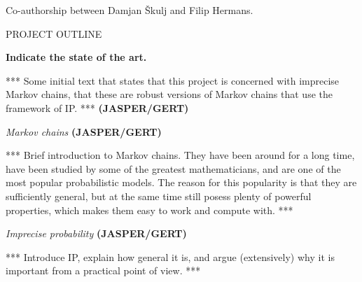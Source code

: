 \documentclass[11pt,dvipsnames,usenames,a4paper]{article}
\begin{document}
Co-authorship between Damjan Škulj and Filip Hermans.





\newpage
{}

\setcounter{page}{1}

\begin{shaded}\centering PROJECT OUTLINE \end{shaded}

\textbf{Indicate the state of the art.}

*** Some initial text that states that this project is concerned with imprecise Markov chains, that these are robust versions of Markov chains that use the framework of IP. *** {\bf\color{blue} (JASPER/GERT)}

\emph{Markov chains} {\bf\color{blue} (JASPER/GERT)}

*** Brief introduction to Markov chains. They have been around for a long time, have been studied by some of the greatest mathematicians, and are one of the most popular probabilistic models. The reason for this popularity is that they are sufficiently general, but at the same time still posess plenty of powerful properties, which makes them easy to work and compute with. ***

\emph{Imprecise probability} {\bf\color{blue} (JASPER/GERT)}

*** Introduce IP, explain how general it is, and argue (extensively) why it is important from a practical point of view. ***
\end{document}

